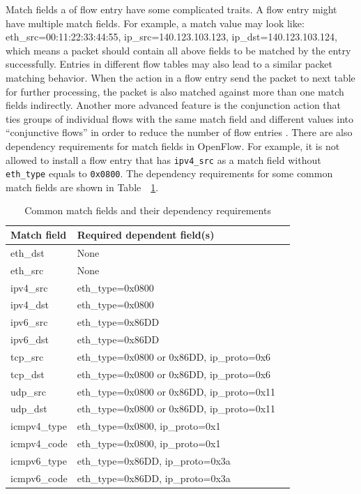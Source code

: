 Match fields a of flow entry have some complicated traits. A flow entry might have multiple match fields. For example, a match value may look like: eth\_src=00:11:22:33:44:55, ip\_src=140.123.103.123, ip\_dst=140.123.103.124, which means a packet should contain all above fields to be matched by the entry successfully. Entries in different flow tables may also lead to a similar packet matching behavior. When the action in a flow entry send the packet to next table for further processing, the packet is also matched against more than one match fields indirectly. Another more advanced feature is the conjunction action that ties groups of individual flows with the same match field and different values into ``conjunctive flows'' in order to reduce the number of flow entries \cite{OVS_OFCTL}. There are also dependency requirements for match fields in OpenFlow. For example, it is not allowed to install a flow entry that has \texttt{ipv4\_src} as a match field without \texttt{eth\_type} equals to \texttt{0x0800}. The dependency requirements for some common match fields are shown in Table~~\ref{table:match_fields_dependency}.

\begin{table}[H]
\centering
\caption{Common match fields and their dependency requirements}
\begin{tabular}{|l|l|l}
\hline Match field & Required dependent field(s) \\
\hline eth\_dst & None \\
\hline eth\_src & None \\
\hline ipv4\_src & eth\_type=0x0800 \\
\hline ipv4\_dst & eth\_type=0x0800 \\
\hline ipv6\_src & eth\_type=0x86DD \\
\hline ipv6\_dst & eth\_type=0x86DD \\
\hline tcp\_src & eth\_type=0x0800 or 0x86DD, ip\_proto=0x6 \\
\hline tcp\_dst & eth\_type=0x0800 or 0x86DD, ip\_proto=0x6 \\
\hline udp\_src & eth\_type=0x0800 or 0x86DD, ip\_proto=0x11 \\
\hline udp\_dst & eth\_type=0x0800 or 0x86DD, ip\_proto=0x11 \\
\hline icmpv4\_type & eth\_type=0x0800, ip\_proto=0x1 \\
\hline icmpv4\_code & eth\_type=0x0800, ip\_proto=0x1 \\
\hline icmpv6\_type & eth\_type=0x86DD, ip\_proto=0x3a \\
\hline icmpv6\_code & eth\_type=0x86DD, ip\_proto=0x3a \\
\hline
\end{tabular}
\label{table:match_fields_dependency}
\end{table}

